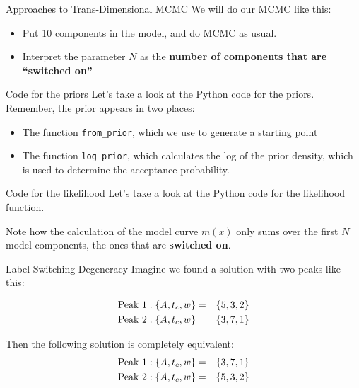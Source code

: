 \begin{frame}[t]{Approaches to Trans-Dimensional MCMC}
We will do our MCMC like this:

\begin{itemize}
\item Put 10 components in the model, and do MCMC as usual.
\item Interpret the parameter $N$ as the {\bf number of components that are ``switched on''}
\end{itemize}

\end{frame}


\begin{frame}[t]{Code for the priors}
Let's take a look at the Python code for the priors. Remember, the prior
appears in two places:

\begin{itemize}
\item The function {\tt from\_prior}, which we use to generate a starting point
\item The function {\tt log\_prior}, which calculates the log of the prior
density, which is used to determine the acceptance probability.
\end{itemize}
\end{frame}


\begin{frame}[t]{Code for the likelihood}
Let's take a look at the Python code for the likelihood function.\\

\vspace{20pt}

Note how the calculation of the model curve $m(x)$ only sums over the first
$N$ model components, the ones that are {\bf switched on}.

\end{frame}

\begin{frame}[t]{Label Switching Degeneracy}
Imagine we found a solution with two peaks like this:

\begin{eqnarray*}
\textnormal{Peak 1}: \{A, t_c, w\} &=& \{5, 3, 2\}\\
\textnormal{Peak 2}: \{A, t_c, w\} &=& \{3, 7, 1\}
\end{eqnarray*}

Then the following solution is completely equivalent:
\begin{eqnarray*}
\textnormal{Peak 1}: \{A, t_c, w\} &=& \{3, 7, 1\}\\
\textnormal{Peak 2}: \{A, t_c, w\} &=& \{5, 3, 2\}
\end{eqnarray*}

\end{frame}


